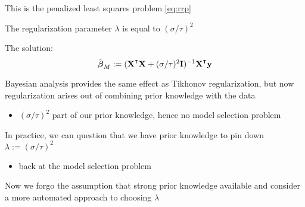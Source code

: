 \begin{frame}

    \vspace{2em}
    This is the penalized least squares problem \eqref{eq:rrp}
    
    The regularization parameter $\lambda$ is equal
    to $(\sigma/\tau)^2$
    
    \vspace{.7em}
    The solution:
    \begin{equation*}
        \hboldbeta_{M} 
            := (\boldX^\T \boldX + (\sigma/\tau)^2 \boldI)^{-1} \boldX^\T \boldy
    \end{equation*}
    
    \vspace{.7em}
    Bayesian analysis provides the same
    effect as Tikhonov regularization, but now regularization arises out of
    combining prior knowledge with the data 
    \begin{itemize}
        \item $(\sigma/\tau)^2$  part of our prior knowledge,  hence no
        model selection problem
    \end{itemize}
    
\end{frame}

\begin{frame}

     \vspace{2em}
    In practice, we can question that we have 
    prior knowledge to pin  down $\lambda := (\sigma/\tau)^2$
    \begin{itemize}
        \item  back at the model
    selection problem
    \end{itemize}
    
    \vspace{.7em}
    Now we forgo the assumption that
    strong prior knowledge available and consider a more automated approach to
    choosing $\lambda$

\end{frame}

